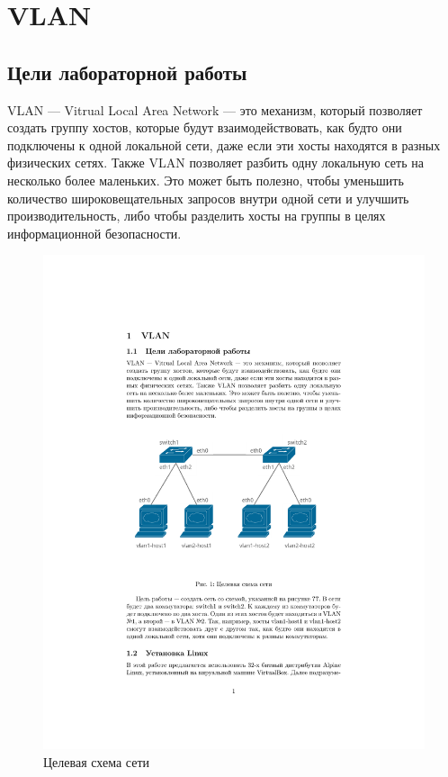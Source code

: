 \documentclass{article}
\author{Александр Валентинов}
\begin{document}
\section{VLAN}
\subsection{Цели лабораторной работы}
VLAN --- Vitrual Local Area Network --- это механизм, который позволяет создать группу хостов, которые будут взаимодействовать, как будто они подключены к одной локальной сети, даже если эти хосты находятся в разных физических сетях. Также VLAN позволяет разбить одну локальную сеть на несколько более маленьких. Это может быть полезно, чтобы уменьшить количество широковещательных запросов внутри одной сети и улучшить производительность, либо чтобы разделить хосты на группы в целях информационной безопасности.

\begin{figure}[h]
\centering
\includegraphics[width=\textwidth]{vlan}
\caption{Целевая схема сети}
\label{vlan-network-configuration}
\end{figure}
\end{document}
